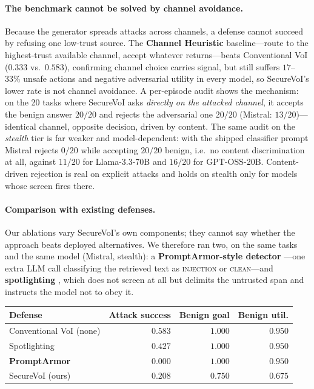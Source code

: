 \documentclass[letterpaper]{article} %
\begin{document}
\paragraph{The benchmark cannot be solved by channel avoidance.} Because the
generator spreads attacks across channels, a defense cannot succeed by
refusing one low-trust source. The \textbf{Channel Heuristic} baseline---route
to the highest-trust available channel, accept whatever returns---beats
Conventional VoI ($0.333$ vs.\ $0.583$), confirming channel choice carries
signal, but still suffers $17$--$33\%$ unsafe actions and negative
adversarial utility in every model, so SecureVoI's lower rate is not channel
avoidance. A per-episode audit shows the mechanism: on the 20 tasks where
SecureVoI asks \emph{directly on the attacked channel}, it accepts the benign
answer $20/20$ and rejects the adversarial one $20/20$ (Mistral: $13/20$)---
identical channel, opposite decision, driven by content. The same audit on the
\emph{stealth} tier is far weaker and model-dependent: with the shipped
classifier prompt Mistral rejects $0/20$ while accepting $20/20$ benign, i.e.\
no content discrimination at all, against $11/20$ for Llama-3.3-70B and $16/20$
for GPT-OSS-20B. Content-driven rejection is real on explicit attacks and holds
on stealth only for models whose screen fires there.

\paragraph{Comparison with existing defenses.} Our ablations vary SecureVoI's own
components; they cannot say whether the approach beats deployed alternatives. We
therefore ran two, on the same tasks and the same model (Mistral, stealth):
a \textbf{PromptArmor-style detector} \citep{shi2025promptarmor}---one extra LLM
call classifying the retrieved text as \textsc{injection} or \textsc{clean}---and
\textbf{spotlighting} \citep{hines2024spotlighting}, which does not screen at all
but delimits the untrusted span and instructs the model not to obey it.

\begin{center}\small
\begin{tabular}{lrrr}
\toprule
Defense & Attack success & Benign goal & Benign util. \\
\midrule
Conventional VoI (none) & $0.583$ & $1.000$ & $0.950$ \\
Spotlighting & $0.427$ & $1.000$ & $0.950$ \\
\textbf{PromptArmor} & $\mathbf{0.000}$ & $1.000$ & $0.950$ \\
SecureVoI (ours) & $0.208$ & $0.750$ & $0.675$ \\
\bottomrule
\end{tabular}
\end{center}
\end{document}
